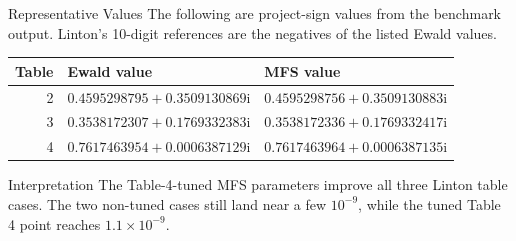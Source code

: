 \documentclass[aspectratio=169]{beamer}
\newcommand{\ii}{\mathrm{i}}
\begin{document}
\begin{frame}{Representative Values}
  \scriptsize
  The following are project-sign values from the benchmark output.  Linton's
  10-digit references are the negatives of the listed Ewald values.

  \vspace{0.2em}
  \begin{center}
  \renewcommand{\arraystretch}{1.15}
  \begin{tabular}{rll}
    \hline
    Table & Ewald value & MFS value\\
    \hline
    2 &
    \(0.4595298795+0.3509130869\ii\) &
    \(0.4595298756+0.3509130883\ii\)\\
    3 &
    \(0.3538172307+0.1769332383\ii\) &
    \(0.3538172336+0.1769332417\ii\)\\
    4 &
    \(0.7617463954+0.0006387129\ii\) &
    \(0.7617463964+0.0006387135\ii\)\\
    \hline
  \end{tabular}
  \end{center}

  \vspace{0.4em}
  \begin{block}{Interpretation}
    The Table-4-tuned MFS parameters improve all three Linton table cases.
    The two non-tuned cases still land near a few \(10^{-9}\), while the
    tuned Table 4 point reaches \(1.1{\times}10^{-9}\).
  \end{block}
\end{frame}
\end{document}
